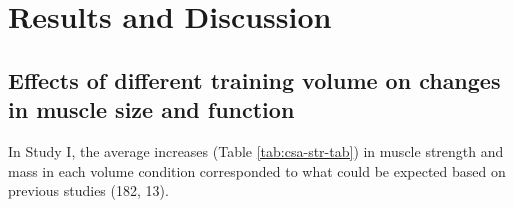 \documentclass[twoside,10pt]{gihclass} %
\begin{document}
\hypertarget{results-and-discussion}{%
\chapter{Results and Discussion}\label{results-and-discussion}}

\hypertarget{effects-of-different-training-volume-on-changes-in-muscle-size-and-function}{%
\section{Effects of different training volume on changes in muscle size and function}\label{effects-of-different-training-volume-on-changes-in-muscle-size-and-function}}

In Study I, the average increases (Table \ref{tab:csa-str-tab}) in muscle strength and mass in each volume condition corresponded to what could be expected based on previous studies
(182, 13).
\end{document}
